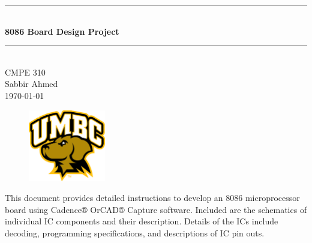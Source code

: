 \begin{titlepage}

    \newcommand{\HRule}{\rule{\linewidth}{0.5mm}}
    \center %


    \HRule \\[0.5cm]
    { \huge \bfseries 8086 Board Design Project}\\[0.4cm]
    \HRule \\[1.5cm]
     

    {\large CMPE 310\\
    Sabbir Ahmed}\\[3cm] %


    {\large \today}\\[2cm]


    \begin{figure}[h]
        \begin{center}
            \includegraphics[width=0.3\textwidth]{figures/uni_logo.jpg}
            \label{fig:uni_logo}
        \end{center}
    \end{figure}

    \vfill %

    \footnotesize This document provides detailed instructions to develop an 8086 microprocessor board using Cadence® OrCAD® Capture software. Included are the schematics of individual IC components and their description. Details of the ICs include decoding, programming specifications, and descriptions of IC pin outs.\\[-1cm]


\end{titlepage}
